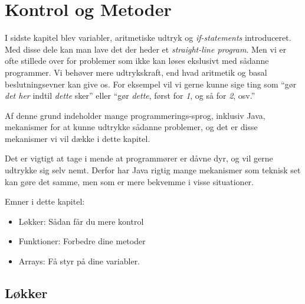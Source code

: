 

\chapter{Kontrol og Metoder}





	I sidste kapitel blev variabler, aritmetiske udtryk og \emph{if-statements}
	introduceret. Med disse dele kan man lave det der heder et
	\emph{straight-line program}. Men vi er ofte stillede over for problemer som
	ikke kan løses ekslusivt med sådanne programmer. Vi behøver mere
	udtrykskraft, end hvad aritmetik og basal beslutningsevner kan give os.
	For eksempel vil vi gerne kunne sige ting som ``gør \emph{det her} indtil
	\emph{dette} sker'' eller ``gør \emph{dette}, først for \emph{1}, og så for
	\emph{2}, osv.''

	Af denne grund indeholder mange programmerings-sprog, inklusiv Java,
	mekanismer for at kunne udtrykke sådanne problemer, og det er disse
	mekanismer vi vil dække i dette kapitel.

	Det er vigtigt at tage i mende at programmører er dåvne dyr, og vil gerne
	udtrykke sig selv nemt. Derfor har Java rigtig mange mekanismer som teknisk
	set kan gøre det samme, men som er mere bekvemme i visse situationer.

	Emner i dette kapitel:

	\begin{itemize} %
		\item Løkker: Sådan får du mere kontrol
		\item Funktioner: Forbedre dine metoder
		\item Arrays: Få styr på dine variabler.
	\end{itemize}

\section{Løkker}

